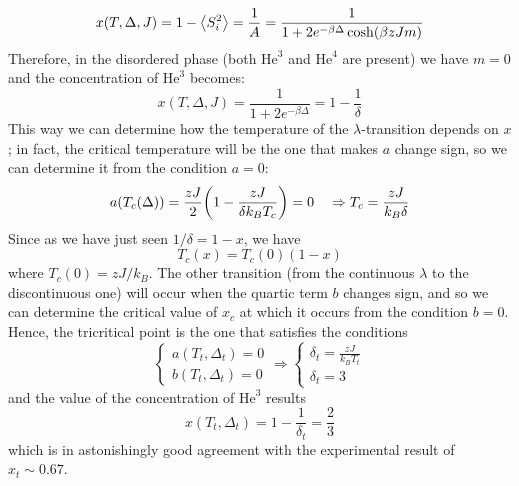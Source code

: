 \documentclass[../main/main.tex]{subfiles}
\begin{document}
\begin{equation*}
    x(T, \Delta , J) = 1 - \expval{S_i^2} = \frac{1}{A}= \frac{1}{ 1 + 2 e^{-\beta \Delta } \cosh (\beta z J m)}
\end{equation*}
Therefore, in the disordered phase (both 
\( \text{He}^3 \) and \( \text{He}^4 \) are present) we have \(m=0\) and the concentration of \( \text{He}^3 \) becomes:
\begin{equation}
  x (T,\Delta , J) = \frac{1}{1 + 2 e^{-\beta \Delta }}  = 1 - \frac{1}{\delta }
\end{equation}
This way we can determine how the temperature of the \(\lambda\)-transition depends on \(x\); in fact, the critical temperature will be the one that makes \(a\) change sign, so we can determine it from the condition \(a=0\):
\begin{equation*}
  a (T_c (\Delta )) = \frac{z J}{2} \qty(1 - \frac{z J}{\delta k_B T_c}) = 0 \quad \Rightarrow T_c = \frac{z J}{k_B \delta}
\end{equation*}
Since as we have just seen \(1/\delta = 1-x\), we have
\begin{equation}
  T_c (x) = T_c (0) (1-x)
\end{equation}
where \(T_c (0)=zJ/k_B \).
The other transition (from the continuous \(\lambda\) to the discontinuous one) will occur when the quartic term \(b\) changes sign, and so we can determine the critical value of \(x_c\) at which it occurs from the condition \(b=0\). Hence, the tricritical point is the one that satisfies the conditions
  \begin{equation*}
    \begin{cases}
     a (T_t, \Delta _t) = 0 \\
     b (T_t, \Delta _t) = 0
    \end{cases} \Rightarrow
    \begin{cases}
      \delta _t = \frac{zJ}{k_B T_t} \\
      \delta _t = 3
    \end{cases}
\end{equation*}
and the value of the concentration of \( \text{He}^3 \) results
\begin{equation}
  x (T_t, \Delta _t) = 1 - \frac{1}{\delta _t} = \frac{2}{3}
\end{equation}
which is in astonishingly good agreement with the experimental result of \(x_t \sim 0.67\).
\end{document}
